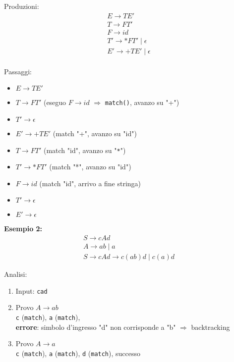 \vspace{0.8em}
Produzioni:
\[
\begin{array}{l}
E \rightarrow T E' \\
T \rightarrow F T' \\
F \rightarrow id \\
T' \rightarrow * F T' \mid \epsilon \\
E' \rightarrow + T E' \mid \epsilon \\
\end{array}
\]

\vspace{0.8em}

Passaggi:
\begin{itemize}
    \item $E \rightarrow T E'$
    \item $T \rightarrow F T'$    \hspace{1em} (eseguo $F \rightarrow id$  $\Rightarrow$ \texttt{match()}, avanzo su "+")
    \item $T' \rightarrow \epsilon$
    \item $E' \rightarrow + T E'$  \hspace{1em} (match "+", avanzo su "id")
    \item $T \rightarrow F T'$     \hspace{1em} (match "id", avanzo su "\texttt{*}")
    \item $T' \rightarrow * F T'$  \hspace{1em} (match "*", avanzo su "id")
    \item $F \rightarrow id$       (match "id", arrivo a fine stringa)
    \item $T' \rightarrow \epsilon$
    \item $E' \rightarrow \epsilon$
\end{itemize}


\textbf{Esempio 2:}
\[
\begin{array}{l}
S \rightarrow cAd \\
A \rightarrow ab \mid a \\
S \rightarrow cAd \to c(ab)d \mid c(a)d
\end{array}
\]

Analisi:
\begin{enumerate}
    \item Input: \texttt{cad}
    \item Provo $A \rightarrow ab$\\
          \texttt{c} (\texttt{match}), \texttt{a} (\texttt{match}),\\
          \textbf{errore}: simbolo d'ingresso "d" non corrisponde a "b" $\Rightarrow$ backtracking
    \item Provo $A \rightarrow a$\\
          \texttt{c} (\texttt{match}), \texttt{a} (\texttt{match}), \texttt{d} (\texttt{match}), successo
\end{enumerate}


